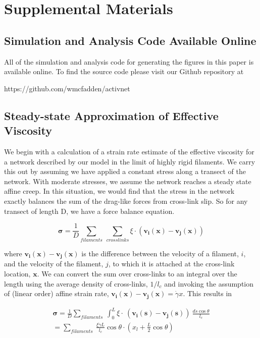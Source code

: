 \section{Supplemental Materials}

\subsection{Simulation and Analysis Code Available Online}
All of the simulation and analysis code for generating the figures in this paper is available online.  To find the source code please visit our Github repository at 

https://github.com/wmcfadden/activnet

\subsection{Steady-state Approximation of Effective Viscosity}
\label{sec:eff_vic}
We begin with a calculation of a strain rate estimate of the effective viscosity for a network described by our model in the limit of highly rigid filaments.  We carry this out by assuming we have applied a constant stress along a transect of the network.  With moderate stresses, we assume the network reaches a steady state affine creep. In this situation, we would find that the stress in the network exactly balances the sum of the drag-like forces from cross-link slip.  So for any transect of length D, we have a force balance equation.

\begin{equation}
	\mathbf{\sigma} = \frac{1}{D}\sum_{filaments}\: \sum_{crosslinks}\xi \cdot (\mathbf{v_i(x)}-\mathbf{v_j(x)})
\end{equation}

where $\mathbf{v_i(x)}-\mathbf{v_j(x)}$ is the difference between the velocity of a filament, $i$, and the velocity of the filament, $j$, to which it is attached at the cross-link location, $\mathbf{x}$. We can convert the sum over cross-links to an integral over the length using the average density of cross-links, $1/l_c$ and invoking the assumption of (linear order) affine strain rate, $\mathbf{v_i(x)}-\mathbf{v_j(x)}=\dot \gamma x$. This results in

\begin{multline}
	\mathbf{\sigma} =  \frac{1}{D}\sum_{filaments}\:  \int_0^L \xi \cdot  \: (\mathbf{v_i(s)}-\mathbf{v_j(s)}) \:\frac{ds \cos \theta }{l_c} \\
	= \sum_{filaments}\:  \frac{\xi \dot \gamma L}{l_c} \cos \theta \cdot (x_l + \frac{L}{2} \cos \theta)
\end{multline}

